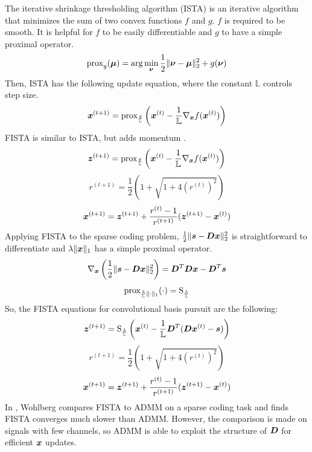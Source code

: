 The iterative shrinkage thresholding algorithm (ISTA) is an iterative algorithm that minimizes the sum of two convex functions $f$ and $g$. $f$ is required to be smooth. It is helpful for $f$ to be easily differentiable and $g$ to have a simple proximal operator.
%
\begin{equation}
\operatorname{prox}_g(\bm{\mu}) = \arg \min_{\bm{\nu}} \frac{1}{2}\|\bm{\nu} - \bm{\mu}\|_2^2 + g(\bm{\nu})
\end{equation}
%
Then, ISTA has the following update equation, where the constant $\mathbb{L}$ controls step size.
%
\begin{equation}
\bm{x}^{(t + 1)} = \operatorname{prox}_{\frac{g}{\mathbb{L}}}\left(\bm{x}^{(t)} - \frac{1}{\mathbb{L}}\nabla_{\bm{x}} f(\bm{x}^{(t)})\right)
\end{equation}
%
FISTA is similar to ISTA, but adds momentum \cite{beck2009fast}.
\begin{equation}
\bm{z}^{(t + 1)} = \operatorname{prox}_{\frac{g}{\mathbb{L}}}\left(\bm{x}^{(t)} - \frac{1}{\mathbb{L}}\nabla_{\bm{x}}f(\bm{x}^{(t)})\right)
\end{equation}
\begin{equation}
r^{(t + 1)} = \frac{1}{2}\left(1 + \sqrt{1 + 4(r^{(t)})^2}\right)
\end{equation}
\begin{equation}
\bm{x}^{(t + 1)} = \bm{z}^{(t + 1)} + \frac{r^{(t)} - 1}{r^{(t + 1)}}(\bm{z}^{(t + 1)} - \bm{x}^{(t)})
\end{equation}
%
Applying FISTA to the sparse coding problem, $\frac{1}{2}\|\bm{s} - \bm{D}\bm{x}\|_2^2$ is straightforward to differentiate and $\lambda\|\bm{x}\|_1$ has a simple proximal operator.
%
\begin{equation}
\nabla_{\bm{x}}\left(\frac{1}{2}\|\bm{s} - \bm{D}\bm{x}\|_2^2\right) = \bm{D}^T\bm{D}\bm{x} - \bm{D}^T\bm{s}
\end{equation}
%
\begin{equation}
\operatorname{prox}_{\frac{\lambda}{\mathbb{L}}\|\cdot\|_1}(\cdot) = \operatorname{S}_{\frac{\lambda}{\mathbb{L}}}
\end{equation}
%
So, the FISTA equations for convolutional basis pursuit are the following:
\begin{equation}
\bm{z}^{(t + 1)} = \operatorname{S}_{\frac{\lambda}{\mathbb{L}}}\left(\bm{x}^{(t)} - \frac{1}{\mathbb{L}}\bm{D}^T(\bm{D}\bm{x}^{(t)} - \bm{s})\right)
\end{equation}
\begin{equation}
r^{(t + 1)} = \frac{1}{2}\left(1 + \sqrt{1 + 4(r^{(t)})^2}\right)
\end{equation}
\begin{equation}
\bm{x}^{(t + 1)} = \bm{z}^{(t + 1)} + \frac{r^{(t)} - 1}{r^{(t + 1)}}(\bm{z}^{(t + 1)} - \bm{x}^{(t)})
\end{equation}
%
In \cite{wohlberg2015efficient}, Wohlberg compares FISTA to ADMM on a sparse coding task and finds FISTA converges much slower than ADMM. However, the comparison is made on signals with few channels, so ADMM is able to exploit the structure of $\bm{D}$ for efficient $\bm{x}$ updates.

